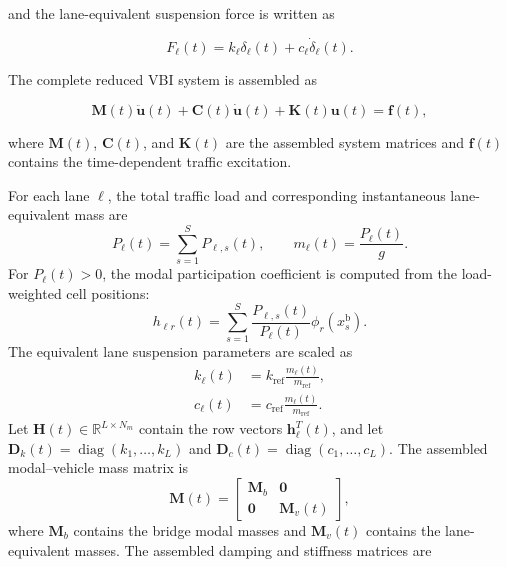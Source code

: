 \documentclass[journal]{IEEEtran}
\begin{document}
and the lane-equivalent
suspension force is written as

\begin{equation}
F_{\ell}(t)
=
k_{\ell}\delta_{\ell}(t)
+
c_{\ell}\dot{\delta}_{\ell}(t).
\end{equation}

The complete reduced
VBI system is assembled as

\begin{equation}
\mathbf{M}(t)\ddot{\mathbf{u}}(t)
+
\mathbf{C}(t)\dot{\mathbf{u}}(t)
+
\mathbf{K}(t)\mathbf{u}(t)
=
\mathbf{f}(t),
\end{equation}

where $\mathbf{M}(t)$, $\mathbf{C}(t)$, and $\mathbf{K}(t)$ are the assembled
system matrices and $\mathbf{f}(t)$ contains the
time-dependent traffic excitation.

For each lane $\ell$, the total traffic load and corresponding
instantaneous lane-equivalent mass are
\begin{equation}
P_{\ell}(t)=\sum_{s=1}^{S}P_{\ell,s}(t),\qquad
m_{\ell}(t)=\frac{P_{\ell}(t)}{g}.
\label{eq:lane_equiv_mass}
\end{equation}
For $P_{\ell}(t)>0$, the modal participation coefficient is
computed from the load-weighted cell positions:
\begin{equation}
h_{\ell r}(t)=\sum_{s=1}^{S}
\frac{P_{\ell,s}(t)}{P_{\ell}(t)}
\phi_r\!\left(x_s^{\mathrm{b}}\right).
\label{eq:lane_modal_participation}
\end{equation}
The equivalent lane suspension parameters are scaled as
\begin{equation}
\begin{aligned}
k_{\ell}(t)&=k_{\mathrm{ref}}
\frac{m_{\ell}(t)}{m_{\mathrm{ref}}},\\
c_{\ell}(t)&=c_{\mathrm{ref}}
\frac{m_{\ell}(t)}{m_{\mathrm{ref}}}.
\end{aligned}
\label{eq:lane_equiv_properties}
\end{equation}
Let $\mathbf{H}(t)\in\mathbb{R}^{L\times N_m}$ contain the
row vectors $\mathbf{h}_{\ell}^{T}(t)$, and let
$\mathbf{D}_k(t)=\operatorname{diag}(k_1,\ldots,k_L)$ and
$\mathbf{D}_c(t)=\operatorname{diag}(c_1,\ldots,c_L)$.
The assembled modal--vehicle mass matrix is
\begin{equation}
\mathbf{M}(t)=
\begin{bmatrix}
\mathbf{M}_b & \mathbf{0}\\
\mathbf{0} & \mathbf{M}_v(t)
\end{bmatrix},
\label{eq:assembled_mass}
\end{equation}
where $\mathbf{M}_b$ contains the bridge modal masses and
$\mathbf{M}_v(t)$ contains the lane-equivalent masses.
The assembled damping and stiffness matrices are
\end{document}
